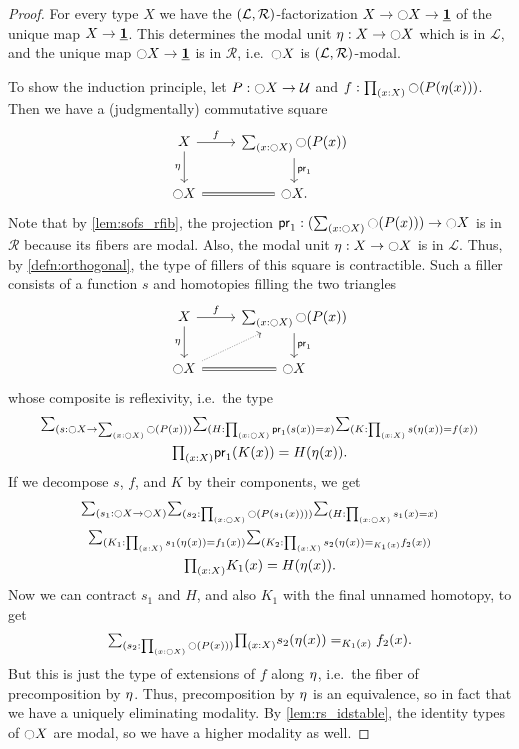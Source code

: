 \begin{proof}
For every type $X$ we have the $(\mathcal{L},\mathcal{R})$-factorization $X\to{\ensuremath{\ocircle}} X\to\underline{\mathbf{1}}$ of the
unique map $X\to\underline{\mathbf{1}}$. This determines the modal unit
${\eta_{}}:X\to{\ensuremath{\ocircle}} X$ which is in $\mathcal{L}$, and the
unique map ${\ocircle} X\to\underline{\mathbf{1}}$ is in $\mathcal{R}$, i.e.\ ${\ocircle} X$ is $(\mathcal{L},\mathcal{R})$-modal.

To show the induction principle, let $P:{\ocircle} X\to\mathcal{U}$ and $f:\prd{x:X} \modal(P(\eta(x)))$.
Then we have a (judgmentally) commutative square
\begin{equation*}
\begin{tikzcd}
X \arrow[r,"f"] \arrow[d,swap,"\modalunit"] & \sm{x:\modal X}\modal(P(x)) \arrow[d,"\proj1"] \\
\modal X \arrow[r,equals] & \modal X.
\end{tikzcd}
\end{equation*}
Note that by \autoref{lem:sofs_rfib},
the projection $\proj1:(\sm{x:\modal X}\modal(P(x)))\to\modal X$ is in $\mathcal{R}$
because its fibers are modal. Also, the modal unit
${\eta_{}}:X\to{\ensuremath{\ocircle}} X$ is in $\mathcal{L}$.
Thus, by \cref{defn:orthogonal}, the type of fillers of this square is contractible.
Such a filler consists of a function $s$ and homotopies filling the two triangles
\begin{equation*}
\begin{tikzcd}
X \arrow[r,"f"] \arrow[d,swap,"\modalunit"] & \sm{x:\modal X}\modal(P(x)) \arrow[d,"\proj1"] \\
\modal X \arrow[r,equals] \arrow[ur,densely dotted] & \modal X
\end{tikzcd}
\end{equation*}
whose composite is reflexivity, i.e.\ the type
\begin{multline*}
\sm{s:\modal X \to \sm{x:\modal X}\modal(P(x))}{H:\prd{x:\modal X} \proj1(s(x))=x}{K:\prd{x:X} s(\modalunit(x))=f(x)}\\
\prd{x:X} \proj1(K(x)) = H(\modalunit(x)).
\end{multline*}
If we decompose $s$, $f$, and $K$ by their components, we get
\begin{multline*}
\sm{s_1:\modal X \to \modal X}{s_2:\prd{x:\modal X} \modal(P(s_1(x)))}{H:\prd{x:\modal X} s_1(x)=x}\\
\sm{K_1:\prd{x:X} s_1(\modalunit(x))=f_1(x)}{K_2 :\prd{x:X} s_2(\modalunit(x)) =_{K_1(x)} f_2(x)}\\
\prd{x:X} K_1(x) = H(\modalunit(x)).
\end{multline*}
Now we can contract $s_1$ and $H$, and also $K_1$ with the final unnamed homotopy, to get
\begin{equation*}
\sm{s_2:\prd{x:\modal X} \modal(P(x))}  \prd{x:X} s_2(\modalunit(x)) =_{K_1(x)} f_2(x).
\end{equation*}
But this is just the type of extensions of $f$ along ${\eta_{}}$, i.e.\ the fiber of precomposition by ${\eta_{}}$.
Thus, precomposition by ${\eta_{}}$ is an equivalence, so in fact that we have a uniquely eliminating modality.
By \cref{lem:rs_idstable}, the identity types of ${\ocircle} X$ are modal, so we have a higher modality as well.
\end{proof}

